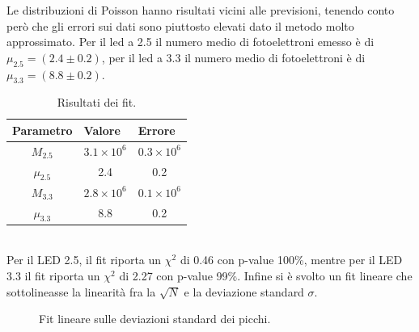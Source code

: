 \documentclass[11pt]{article} %
\begin{document}
Le distribuzioni di Poisson hanno risultati vicini alle previsioni, tenendo conto però che gli errori sui dati sono piuttosto elevati dato il metodo molto approssimato. Per il led a 2.5 il numero medio di fotoelettroni emesso è di $\mu_{2.5}=\left(2.4\pm0.2\right)$, per il led a 3.3 il numero medio di fotoelettroni è di $\mu_{3.3}=\left(8.8\pm0.2\right)$.
\begin{table}[!h]
\begin{center}
\begin{tabular}{|c|c|c|}
\hline
\multicolumn{1}{|l|}{Parametro} & \multicolumn{1}{l|}{Valore} & \multicolumn{1}{l|}{Errore}  \\ \hline\hline
$M_{2.5}$                               & $3.1\times10^{6} $                     & $0.3\times10^{6}  $                          \\ \hline
$\mu_{2.5}$                               & 2.4                       & 0.2                             \\ \hline \hline
$M_{3.3}$                               & $2.8\times10^{6} $                   & $0.1\times10^{6} $                        \\ \hline
$\mu_{3.3}$                               & 8.8                      & 0.2                             \\ \hline
\end{tabular}
\end{center}
\caption{Risultati dei fit.}
\end{table}
\\Per il LED 2.5, il fit riporta un $\chi^2$ di 0.46 con p-value 100\%, mentre per il LED 3.3 il fit riporta un $\chi^2$ di 2.27 con p-value 99\%.
Infine si è svolto un fit lineare che sottolineasse la linearità fra la $\sqrt{N}$ e la deviazione standard $\sigma$.
\begin{figure}[!h]
\centering
\caption{Fit lineare sulle deviazioni standard dei picchi.}
\end{figure}
\end{document}
